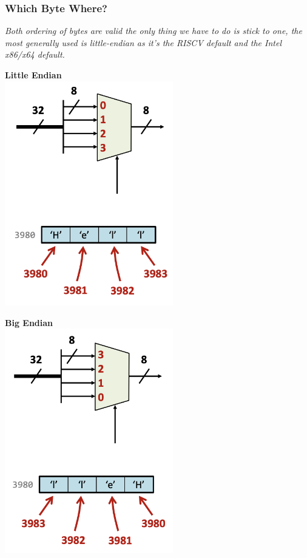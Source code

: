 \subsubsection{Which Byte Where?}
\textit{Both ordering of bytes are valid the only thing we have to do is stick to one, the most generally used is little-endian as it's the RISCV default and the Intel x86/x64 default.} \\ \vspace*{5px}
\begin{minipage}[htp]{0.45\textwidth}
    \begin{center}
        \textbf{Little Endian} \\ \vspace*{5px}
        \includegraphics[width=0.55\textwidth]{chapters/chapter1c/images/bytes.png}
    \end{center}   
\end{minipage}
\hfill
\vline
\hfill
\begin{minipage}[htp]{0.45\textwidth}
    \begin{center}
        \textbf{Big Endian} \\ \vspace*{5px}
        \includegraphics[width=0.55\textwidth]{chapters/chapter1c/images/bytes2.png}
\end{center}
\end{minipage} \\ \vspace*{5px}
